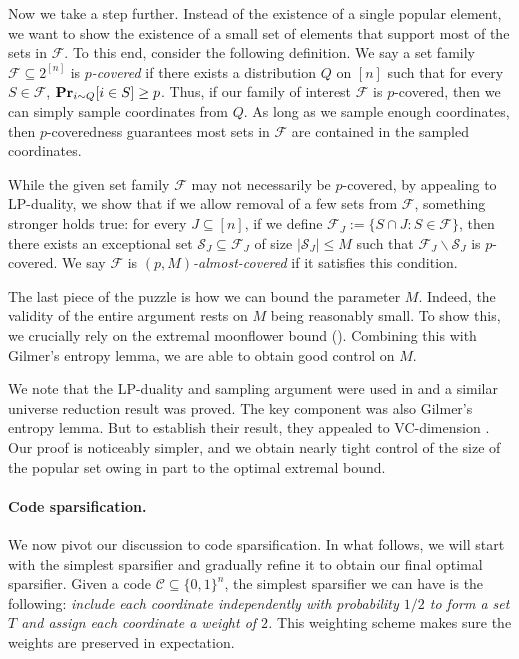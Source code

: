 \documentclass{article}
\renewcommand{\Pr}{\mathop{\bf Pr\/}}
\newcommand{\<}{\langle}
\renewcommand{\>}{\rangle}
\newcommand{\calC}{\mathcal{C}}
\newcommand{\calF}{\mathcal{F}}
\newcommand{\calS}{\mathcal{S}}
\begin{document}
Now we take a step further. Instead of the existence of a single popular element, we want to show the existence of a small set of elements that support most of the sets in $\calF$. To this end, consider the following definition. We say a set family $\calF \subseteq 2^{[n]}$ is \emph{$p$-covered} if there exists a distribution $Q$ on $[n]$ such that for every $S \in \calF$, $\Pr_{i \sim Q}[i \in S] \geq p$. Thus, if our family of interest $\calF$ is $p$-covered, then we can simply sample coordinates from $Q$. As long as we sample enough coordinates, then $p$-coveredness guarantees most sets in $\calF$ are contained in the sampled coordinates.

While the given set family $\calF$ may not necessarily be $p$-covered, by appealing to LP-duality, we show that if we allow removal of a few sets from $\calF$, something stronger holds true: for every $J \subseteq [n]$, if we define $\calF_J:= \{S \cap J: S \in \calF\}$, then there exists an exceptional set $\calS_J \subseteq \calF_J$ of size $|\calS_J| \leq M$ such that $\calF_J \backslash \calS_J$ is $p$-covered. We say $\calF$ is \emph{$(p, M)$-almost-covered} if it satisfies this condition.

The last piece of the puzzle is how we can bound the parameter $M$. Indeed, the validity of the entire argument rests on $M$ being reasonably small. To show this, we crucially rely on the extremal moonflower bound (). Combining this with Gilmer's entropy lemma, we are able to obtain good control on $M$.

We note that the LP-duality and sampling argument were used in \cite{BG25} and a similar universe reduction result was proved. The key component was also Gilmer's entropy lemma. But to establish their result, they appealed to VC-dimension \cite{Sau72, She72}. Our proof is noticeably simpler, and we obtain nearly tight control of the size of the popular set owing in part to the optimal extremal bound.   

\paragraph{Code sparsification. } We now pivot our discussion to code sparsification. In what follows, we will start with the simplest sparsifier and gradually refine it to obtain our final optimal sparsifier. Given a code $\calC \subseteq \{0, 1\}^n$, the simplest sparsifier we can have is the following: \emph{include each coordinate independently with probability $1/2$ to form a set $T$ and assign each coordinate a weight of $2$.} This weighting scheme makes sure the weights are preserved in expectation.
\end{document}

